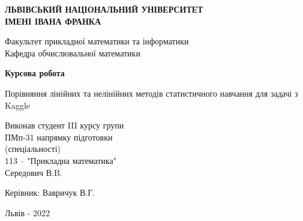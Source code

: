 \documentclass[14pt,a4paper]{extarticle}
\newcounter{e}
\newcounter{tabl}
\numberwithin{equation}{section}
\numberwithin{figure}{section}
\begin{document}
	\thispagestyle{empty}
	\begin{center}
		{\textbf{ЛЬВІВСЬКИЙ НАЦІОНАЛЬНИЙ УНІВЕРСИТЕТ \\ ІМЕНІ ІВАНА ФРАНКА}}\par
		{Факультет прикладної математики та інформатики \\ Кафедра обчислювальної математики}\par
		\vspace{40mm}
		{\textbf{\huge{Курсова робота}}}\par
		\vspace{5mm}
		{\large{Порівняння лінійних та нелінійних методів статистичного навчання для задачі з Kaggle}}\par
		\vspace{5mm}\par %
	\end{center}
	
	\vfill
	\vskip80pt
	
	\begin{flushleft}
		\hskip 8cm 
		Виконав студент III курсу групи
		\\ \hskip8cm
		ПМп-31 напрямку підготовки 
		\\ \hskip8cm
		(спеціальності)
		\\ \hskip8cm
		113 -- "Прикладна математика"
		\\ \hskip8cm
		Середович В.B.
	\end{flushleft}
	\begin{flushleft}
		\hskip8cm 
		Керівник: Вавричук В.Г.
	\end{flushleft}
	
	\vfill
	
	\begin{center}
		\large
		Львів - 2022
	\end{center}
	
	\newpage
	\thispagestyle{empty}
	\tableofcontents
	
	\newpage
	\thispagestyle{empty}
\end{document}
